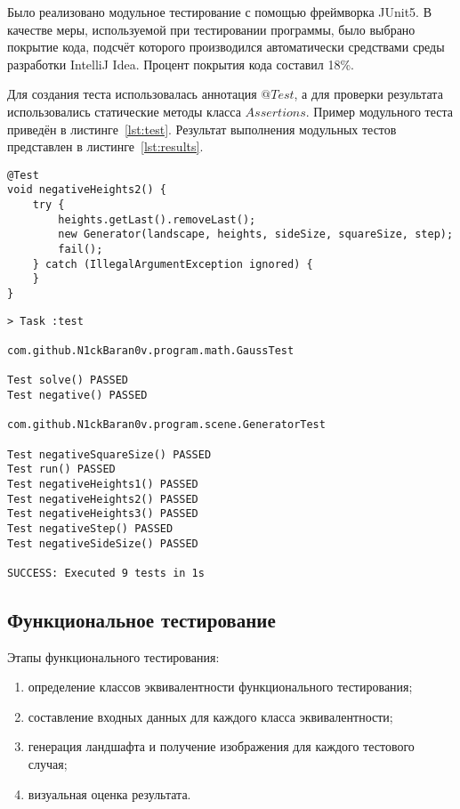 Было реализовано модульное тестирование с помощью фреймворка JUnit5. В качестве меры, используемой при тестировании программы, было выбрано покрытие кода, подсчёт которого производился автоматически средствами среды разработки IntelliJ Idea. Процент покрытия кода составил 18\%.

Для создания теста использовалась аннотация $@Test$, а для проверки результата использовались статические методы класса $Assertions$. Пример модульного теста приведён в листинге~\ref{lst:test}.
Результат выполнения модульных тестов представлен в листинге~\ref{lst:results}.

\begin{lstlisting}[label=lst:test,caption=Пример модульного теста]
@Test
void negativeHeights2() {
	try {
		heights.getLast().removeLast();
		new Generator(landscape, heights, sideSize, squareSize, step);
		fail();
	} catch (IllegalArgumentException ignored) {
	}
}
\end{lstlisting}

\begin{lstlisting}[label=lst:results,caption=Результат выполнения модульных тестов]
> Task :test

com.github.N1ckBaran0v.program.math.GaussTest

Test solve() PASSED
Test negative() PASSED

com.github.N1ckBaran0v.program.scene.GeneratorTest

Test negativeSquareSize() PASSED
Test run() PASSED
Test negativeHeights1() PASSED
Test negativeHeights2() PASSED
Test negativeHeights3() PASSED
Test negativeStep() PASSED
Test negativeSideSize() PASSED

SUCCESS: Executed 9 tests in 1s

\end{lstlisting}

\subsection{Функциональное тестирование}

Этапы функционального тестирования:

\begin{enumerate}
	\item определение классов эквивалентности функционального тестирования;
	\item составление входных данных для каждого класса эквивалентности;
	\item генерация ландшафта и получение изображения для каждого тестового случая;
	\item визуальная оценка результата.
\end{enumerate}

